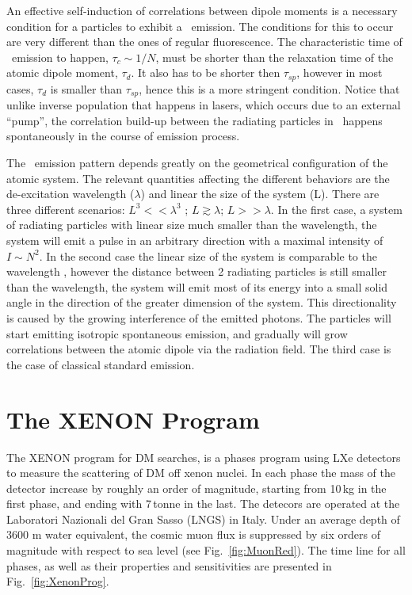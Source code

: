 An effective self-induction of correlations between dipole moments is a necessary condition for a particles to exhibit a \superradiance\ emission. The conditions for this to occur are very different than the ones of regular fluorescence. The characteristic time of \superradiance\ emission to happen, $\tau_c \sim 1/N $, must be shorter than the relaxation time of the atomic dipole moment, $\tau_d$. It also has to be shorter then $\tau_{sp}$, however in most cases, $\tau_{d}$ is smaller than $\tau_{sp}$, hence this is a more stringent condition. Notice that unlike inverse population that happens in lasers, which occurs due to an external ``pump'', the correlation build-up between the radiating particles in \superradiance\ happens spontaneously in the course of emission process.

The \superradiance\ emission pattern depends greatly on the geometrical configuration of the atomic system. The relevant quantities affecting the  different behaviors are the de-excitation wavelength ($\lambda$) and linear the size of the system (L). There are three different scenarios: $L^3<<\lambda^3$ ; $L \gtrsim \lambda$; $L>>\lambda$. In the first case, a system of radiating particles with linear size much smaller than the wavelength, the system will emit a pulse in an arbitrary direction with a maximal intensity of $I \sim N^2$. In the second case the linear size of the system is comparable to the wavelength , however the distance between 2 radiating particles is still smaller than the wavelength, the system will emit most of its energy into a small solid angle in the direction of the greater dimension of the system. This directionality is caused by the growing interference of the emitted photons. The particles will start emitting isotropic spontaneous emission, and gradually will grow correlations between the atomic dipole via the radiation field. The third case is the case of classical standard emission.

 
        








\section{The XENON Program}
\label{sec:xenonProg}

The XENON program for DM searches, is a phases program using LXe detectors to measure the scattering of DM off xenon nuclei. In each phase the mass of the detector increase by roughly an order of magnitude, starting from 10\,kg in the first phase, and ending with 7\,tonne in the last. The detecors are operated at the Laboratori Nazionali del Gran Sasso (LNGS) in Italy. Under an average depth of 3600 m water equivalent, the cosmic muon
flux is suppressed by six orders of magnitude with respect to sea level (see Fig.~\ref{fig:MuonRed}). The time line for all phases, as well as their properties and sensitivities are presented in Fig.~\ref{fig:XenonProg}.

